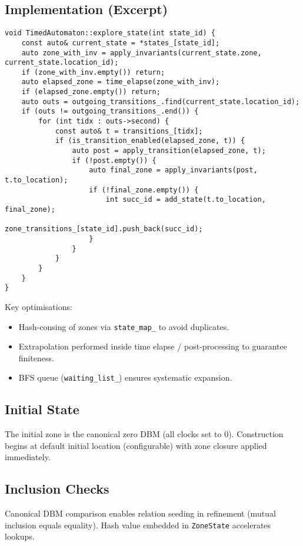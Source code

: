 \subsection{Implementation (Excerpt)}
\begin{lstlisting}
void TimedAutomaton::explore_state(int state_id) {
    const auto& current_state = *states_[state_id];
    auto zone_with_inv = apply_invariants(current_state.zone, current_state.location_id);
    if (zone_with_inv.empty()) return;
    auto elapsed_zone = time_elapse(zone_with_inv);
    if (elapsed_zone.empty()) return;
    auto outs = outgoing_transitions_.find(current_state.location_id);
    if (outs != outgoing_transitions_.end()) {
        for (int tidx : outs->second) {
            const auto& t = transitions_[tidx];
            if (is_transition_enabled(elapsed_zone, t)) {
                auto post = apply_transition(elapsed_zone, t);
                if (!post.empty()) {
                    auto final_zone = apply_invariants(post, t.to_location);
                    if (!final_zone.empty()) {
                        int succ_id = add_state(t.to_location, final_zone);
                        zone_transitions_[state_id].push_back(succ_id);
                    }
                }
            }
        }
    }
}
\end{lstlisting}
Key optimisations:
\begin{itemize}
  \item Hash-consing of zones via \texttt{state\_map\_} to avoid duplicates.
  \item Extrapolation performed inside time elapse / post-processing to guarantee finiteness.
  \item BFS queue (\texttt{waiting\_list\_}) ensures systematic expansion.
\end{itemize}

\subsection{Initial State}
The initial zone is the canonical zero DBM (all clocks set to 0). Construction begins at default initial location (configurable) with zone closure applied immediately.

\subsection{Inclusion Checks}
Canonical DBM comparison enables relation seeding in refinement (mutual inclusion equals equality). Hash value embedded in \texttt{ZoneState} accelerates lookups.
